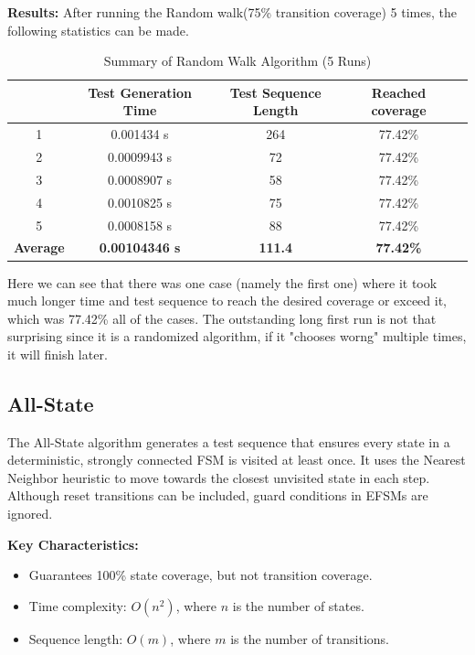 \documentclass[main.tex]{subfiles}
\begin{document}
\textbf{Results:} After running the Random walk(75\% transition coverage) 5 times, the following statistics can be made.
\begin{table}[H]
\centering
\begin{tabular}{|c|c|c|c|c|}
\hline
 & \textbf{Test Generation Time} & \textbf{Test Sequence Length} & \textbf{Reached coverage} \\ \hline
1 & 0.001434 s & 264 & 77.42\% \\ \hline
2 & 0.0009943 s & 72 & 77.42\% \\ \hline
3 & 0.0008907 s & 58 & 77.42\% \\ \hline
4 & 0.0010825 s & 75 & 77.42\% \\ \hline
5 & 0.0008158 s & 88 & 77.42\% \\ \hline
\textbf{Average} & \textbf{0.00104346
 s} & \textbf{111.4} & \textbf{77.42\%} \\ \hline
\end{tabular}
\caption{Summary of Random Walk Algorithm (5 Runs)}
\label{table:random_walk_summary}
\end{table}
Here we can see that there was one case (namely the first one) where it took much longer time and test sequence to reach the desired coverage or exceed it, which was 77.42\% all of the cases.  The outstanding long first run is not that surprising since it is a randomized algorithm, if it "chooses worng" multiple times, it will finish later.


\subsection{All-State}
The All-State algorithm generates a test sequence that ensures every state in a deterministic, strongly connected FSM is visited at least once. It uses the Nearest Neighbor heuristic to move towards the closest unvisited state in each step. Although reset transitions can be included, guard conditions in EFSMs are ignored. 

\textbf{Key Characteristics:}
\begin{itemize}
    \item Guarantees 100\% state coverage, but not transition coverage.
    \item Time complexity: $O(n^2)$, where $n$ is the number of states.
    \item Sequence length: $O(m)$, where $m$ is the number of transitions.
\end{itemize}
\end{document}

